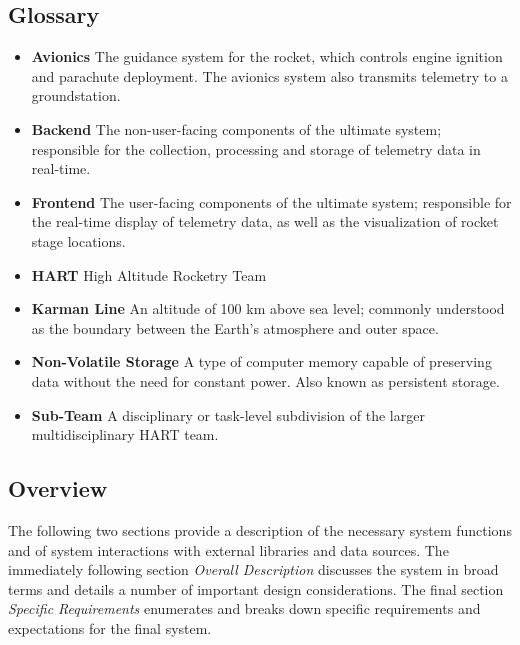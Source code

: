 \documentclass[onecolumn, draftclsnofoot,10pt, compsoc]{IEEEtran}
\begin{document}
		\subsection{Glossary}
			\begin{itemize}
				\item \textbf{Avionics}
					The guidance system for the rocket, which controls engine ignition and parachute deployment.
					The avionics system also transmits telemetry to a groundstation.
				\item \textbf{Backend}
					The non-user-facing components of the ultimate system; responsible for the collection, processing and storage of telemetry data in real-time.
				\item \textbf{Frontend}
					The user-facing components of the ultimate system; responsible for the real-time display of telemetry data, as well as the visualization of rocket stage locations.
				\item \textbf{HART}
					High Altitude Rocketry Team
				\item \textbf{Karman Line}
					An altitude of 100 km above sea level; commonly understood as the boundary between the Earth's atmosphere and outer space.
				\item \textbf{Non-Volatile Storage}
					A type of computer memory capable of preserving data without the need for constant power. Also known as persistent storage.
				\item \textbf{Sub-Team}
					A disciplinary or task-level subdivision of the larger multidisciplinary HART team.

			\end{itemize}


		\subsection{Overview}
			The following two sections provide a description of the necessary system functions and of system interactions with external libraries and data sources.
			The immediately following section \textit{Overall Description} discusses the system in broad terms and details a number of important design considerations. 
			The final section \textit{Specific Requirements} enumerates and breaks down specific requirements and expectations for the final system.
\end{document}
